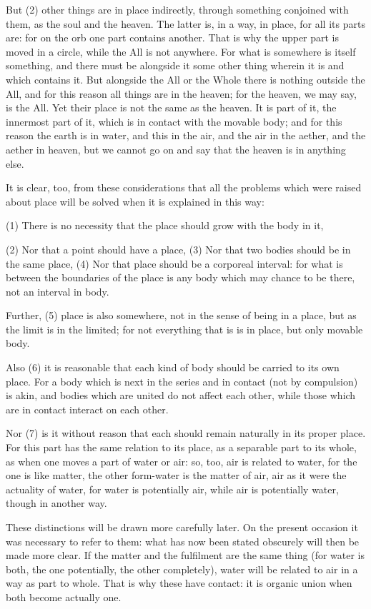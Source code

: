 But (2) other things are in place indirectly, through something conjoined
with them, as the soul and the heaven. The latter is, in a way, in
place, for all its parts are: for on the orb one part contains another.
That is why the upper part is moved in a circle, while the All is
not anywhere. For what is somewhere is itself something, and there
must be alongside it some other thing wherein it is and which contains
it. But alongside the All or the Whole there is nothing outside the
All, and for this reason all things are in the heaven; for the heaven,
we may say, is the All. Yet their place is not the same as the heaven.
It is part of it, the innermost part of it, which is in contact with
the movable body; and for this reason the earth is in water, and this
in the air, and the air in the aether, and the aether in heaven, but
we cannot go on and say that the heaven is in anything else.

It is clear, too, from these considerations that all the problems
which were raised about place will be solved when it is explained
in this way: 

(1) There is no necessity that the place should grow with the body
in it, 

(2) Nor that a point should have a place, 
(3) Nor that two bodies should be in the same place, 
(4) Nor that place should be a corporeal interval: for what is between
the boundaries of the place is any body which may chance to be there,
not an interval in body. 

Further, (5) place is also somewhere, not in the sense of being in
a place, but as the limit is in the limited; for not everything that
is is in place, but only movable body. 

Also (6) it is reasonable that each kind of body should be carried
to its own place. For a body which is next in the series and in contact
(not by compulsion) is akin, and bodies which are united do not affect
each other, while those which are in contact interact on each other.

Nor (7) is it without reason that each should remain naturally in
its proper place. For this part has the same relation to its place,
as a separable part to its whole, as when one moves a part of water
or air: so, too, air is related to water, for the one is like matter,
the other form-water is the matter of air, air as it were the actuality
of water, for water is potentially air, while air is potentially water,
though in another way. 

These distinctions will be drawn more carefully later. On the present
occasion it was necessary to refer to them: what has now been stated
obscurely will then be made more clear. If the matter and the fulfilment
are the same thing (for water is both, the one potentially, the other
completely), water will be related to air in a way as part to whole.
That is why these have contact: it is organic union when both become
actually one. 

